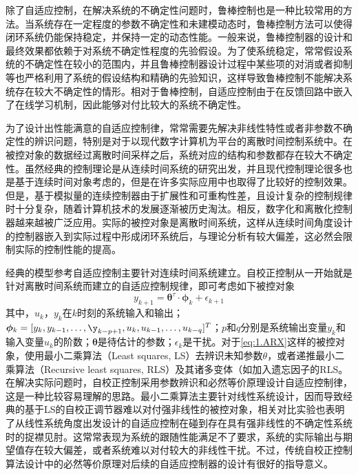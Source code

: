 除了自适应控制，在解决系统的不确定性问题时，鲁棒控制也是一种比较常用的方法。当系统存在一定程度的参数不确定性和未建模动态时，鲁棒控制方法可以使得闭环系统仍能保持稳定，并保持一定的动态性能。一般来说，鲁棒控制器的设计和最终效果都依赖于对系统不确定性程度的先验假设。为了使系统稳定，常常假设系统的不确定性在较小的范围内，并且鲁棒控制器设计过程中某些项的对消或者抑制等也严格利用了系统的假设结构和精确的先验知识，这样导致鲁棒控制不能解决系统存在较大不确定性的情形。相对于鲁棒控制，自适应控制由于在反馈回路中嵌入了在线学习机制，因此能够对付比较大的系统不确定性。

为了设计出性能满意的自适应控制律，常常需要先解决非线性特性或者非参数不确定性的辨识问题，特别是对于以现代数字计算机为平台的离散时间控制系统中。在被控对象的数据经过离散时间采样之后，系统对应的结构和参数都存在较大不确定性。虽然经典的控制理论是从连续时间系统的研究出发，并且现代控制理论很多也是基于连续时间对象考虑的，但是在许多实际应用中也取得了比较好的控制效果。但是，基于模拟量的连续控制器由于扩展性和可重构性差，且设计复杂的控制规律时十分复杂，随着计算机技术的发展逐渐被历史淘汰。相反，数字化和离散化控制器越来越被广泛应用。实际的被控对象是离散时间系统，这样从连续时间角度设计的控制器嵌入到实际过程中形成闭环系统后，与理论分析有较大偏差，这必然会限制实际的控制性能的提高。

经典的模型参考自适应控制主要针对连续时间系统建立。自校正控制从一开始就是针对离散时间系统而建立的自适应控制规律，即可考虑如下被控对象
\begin{equation}%
\label{eq:1.ARX}
y_{k+1} = \bm{\theta}^{\tau}\cdot\bm{\phi}_{k} + \epsilon_{k+1}
\end{equation}
其中，$u_{k}$，$y_{k}$在$k$时刻的系统输入和输出；$\bm{\phi}_{k} = [y_{k},y_{k-1},\ldots,\y_{k-p+1},u_{k},u_{k-1},\ldots,u_{k-q}]^{T}$；$p$和$q$分别是系统输出变量$y_{k}$和输入变量$u_{k}$的阶数；$\bm{\theta}$是待估计的参数；$\epsilon_{k}$是干扰。对于\eqref{eq:1.ARX}这样的被控对象，使用最小二乘算法（Least squares, LS）去辨识未知参数$\theta$，或者递推最小二乘算法（Recursive least squares, RLS）及其诸多变体（如加入遗忘因子的RLS。在解决实际问题时，自校正控制采用参数辨识和必然等价原理设计自适应控制律，这是一种比较容易理解的思路。最小二乘算法主要针对线性系统设计，因而导致经典的基于LS的自校正调节器难以对付强非线性的被控对象，相关对比实验也表明了从线性系统角度出发设计的自适应控制在碰到存在具有强非线性的不确定性系统时的捉襟见肘。这常常表现为系统的跟随性能满足不了要求，系统的实际输出与期望值存在较大偏差，或者系统难以对付较大的非线性干扰。不过，传统自校正控制算法设计中的必然等价原理对后续的自适应控制器的设计有很好的指导意义。

